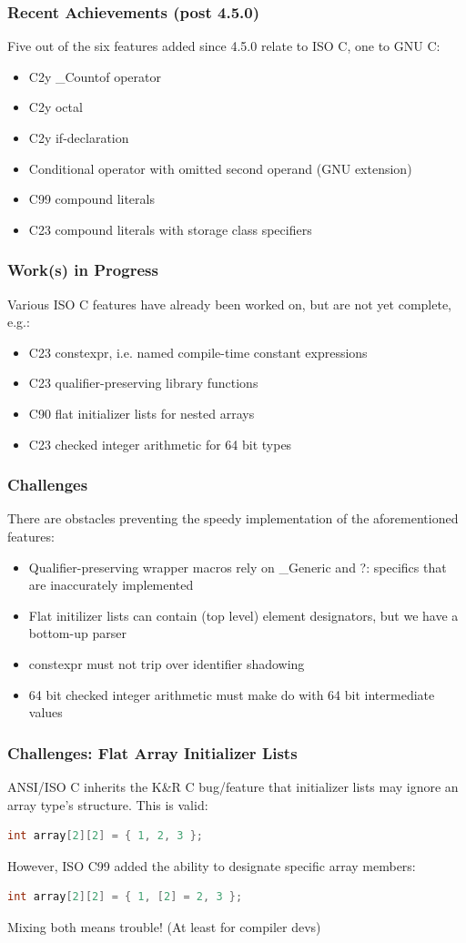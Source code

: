 \documentclass[xcolor=dvipsnames]{beamer}
\begin{document}
\begin{frame}
	\frametitle{Recent Achievements (post 4.5.0)}
	Five out of the six features added since 4.5.0 relate to ISO C, one to GNU C:
	\begin{itemize}
		\item C2y \_Countof operator
		\item C2y octal
		\item C2y if-declaration
		\item Conditional operator with omitted second operand (GNU extension)
		\item C99 compound literals
		\item C23 compound literals with storage class specifiers
	\end{itemize}
\end{frame}

\begin{frame}
	\frametitle{Work(s) in Progress}
	Various ISO C features have already been worked on, but are not yet complete, e.g.:
	\begin{itemize}
		\item C23 constexpr, i.e. named compile-time constant expressions
		\item C23 qualifier-preserving library functions
		\item C90 flat initializer lists for nested arrays
		\item C23 checked integer arithmetic for 64 bit types
	\end{itemize}
\end{frame}

\begin{frame}
	\frametitle{Challenges}
	There are obstacles preventing the speedy implementation of the aforementioned features:
	\begin{itemize}
		\item Qualifier-preserving wrapper macros rely on \_Generic and ?: specifics that are inaccurately implemented
		\item Flat initilizer lists can contain (top level) element designators, but we have a bottom-up parser
		\item constexpr must not trip over identifier shadowing
		\item 64 bit checked integer arithmetic must make do with 64 bit intermediate values
	\end{itemize}
\end{frame}

\begin{frame}[fragile]
	\frametitle{Challenges: Flat Array Initializer Lists}
	ANSI/ISO C inherits the K\&R C bug/feature that initializer lists may ignore an array type's structure. This is valid:
\begin{lstlisting}[language=C,basicstyle=\footnotesize]
int array[2][2] = { 1, 2, 3 };
\end{lstlisting}
However, ISO C99 added the ability to designate specific array members:
\begin{lstlisting}[language=C,basicstyle=\footnotesize]
int array[2][2] = { 1, [2] = 2, 3 };
\end{lstlisting}
Mixing both means trouble! (At least for compiler devs)
\end{frame}
\end{document}
